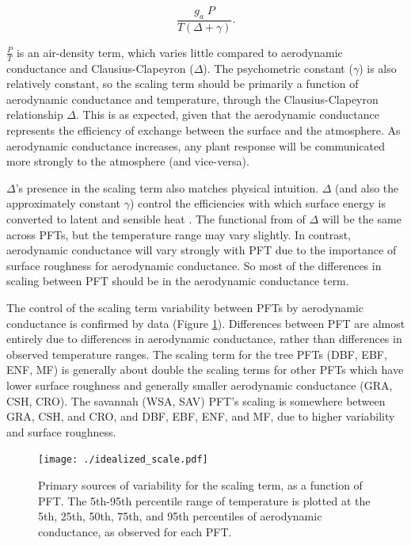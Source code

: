 \documentclass[draft,linenumbers]{afmjournal}
\begin{document}
\begin{equation}
  \frac{g_a \; P}{T(\Delta + \gamma)}.
\end{equation}

$\frac{P}{T}$ is an air-density term, which varies little compared to
aerodynamic conductance and Clausius-Clapeyron ($\Delta$). The
psychometric constant ($\gamma$) is also relatively constant, so the
scaling term should be primarily a function of aerodynamic conductance
and temperature, through the Clausius-Clapeyron relationship
$\Delta$. This is as expected, given that the aerodynamic conductance
represents the efficiency of exchange between the surface and the
atmosphere. As aerodynamic conductance increases, any plant response
will be communicated more strongly to the atmosphere (and vice-versa).

$\Delta$'s presence in the scaling term also matches physical
intuition. $\Delta$ (and also the approximately constant $\gamma$)
control the efficiencies with which surface energy is converted to
latent and sensible heat \citep{Monteith_1965}. The functional from of
$\Delta$ will be the same across PFTs, but the temperature range may
vary slightly. In contrast, aerodynamic conductance will vary strongly
with PFT due to the importance of surface roughness for aerodynamic
conductance. So most of the differences in scaling between PFT should
be in the aerodynamic conductance term.

The control of the scaling term variability between PFTs by
aerodynamic conductance is confirmed by data (Figure
\ref{scale_vary}). Differences between PFT are almost entirely due to
differences in aerodynamic conductance, rather than differences in
observed temperature ranges. The scaling term for the tree PFTs (DBF,
EBF, ENF, MF) is generally about double the scaling terms for other
PFTs which have lower surface roughness and generally smaller
aerodynamic conductance (GRA, CSH, CRO). The savannah (WSA, SAV) PFT's
scaling is somewhere between GRA, CSH, and CRO, and DBF, EBF, ENF, and
MF, due to higher variability and surface roughness.

\begin{figure}
  \centerline{\texttt{[image: ./idealized\_scale.pdf]}}
  \caption{Primary sources of variability for the scaling term, as a
    function of PFT. The 5th-95th percentile range of temperature is
    plotted at the 5th, 25th, 50th, 75th, and 95th percentiles of
    aerodynamic conductance, as observed for each PFT.}
  \label{scale_vary}
\end{figure}
\end{document}
